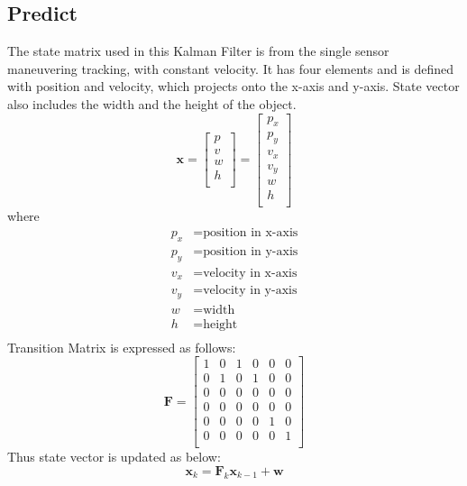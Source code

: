 \subsection{Predict}\label{sec:2-predict}
The state matrix used in this Kalman Filter \cite{kalman} is from the single sensor maneuvering tracking, with constant velocity.
It has four elements and is defined with position and velocity, which projects onto the x-axis and y-axis.
State vector also includes the width and the height of the object\cite{4732695}.
\begin{equation}\label{equ:state_eq}
    \mathbf{x} = 
        \begin{bmatrix} 
        p \\ 
        v \\
        w \\
        h \\

        \end{bmatrix} = 
        \begin{bmatrix} 
        p_x \\ 
        p_y \\ 
        v_x \\ 
        v_y \\
        w \\
        h \\
        \end{bmatrix}
\end{equation}
where
\begin{align*}
    p_x &=\text{position in x-axis}\\
    p_y &=\text{position in y-axis}\\
    v_x &=\text{velocity in x-axis}\\
    v_y &=\text{velocity in y-axis}\\
    w &=\text{width}\\%
    h &=\text{height}\\
\end{align*}
Transition Matrix is expressed as follows:
\begin{equation}\label{equ:transition_matrix_H}
    \mathbf{F} = 
    \begin{bmatrix}
        1 & 0 & 1 & 0 & 0 & 0\\
        0 & 1 & 0 & 1 & 0 & 0\\
        0 & 0 & 0 & 0 & 0 & 0\\
        0 & 0 & 0 & 0 & 0 & 0\\
        0 & 0 & 0 & 0 & 1 & 0\\
        0 & 0 & 0 & 0 & 0 & 1\\
      \end{bmatrix}
\end{equation}
Thus state vector is updated as below:
\begin{equation}\label{equ:predict_eq}
    \mathbf{x}_k=\mathbf{F}_k\mathbf{x}_{k-1}+\mathbf{w}
\end{equation}

